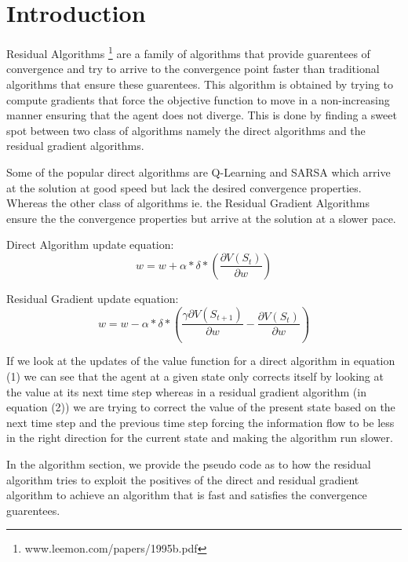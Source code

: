 \documentclass[fleqn]{article}
\begin{document}

\section*{Introduction}
Residual Algorithms \footnote{www.leemon.com/papers/1995b.pdf} are a family of algorithms that provide guarentees of convergence and try to arrive to the convergence point faster than traditional algorithms that ensure these guarentees. This algorithm is obtained by trying to compute gradients that force the objective function to move in a non-increasing manner ensuring that the agent does not diverge. This is done by finding a sweet spot between two class of algorithms namely the direct algorithms and the residual gradient algorithms.

Some of the popular direct algorithms are Q-Learning and SARSA which arrive at the solution at good speed but lack the desired convergence properties. Whereas the other class of algorithms ie. the Residual Gradient Algorithms ensure the the convergence properties but arrive at the solution at a slower pace.

Direct Algorithm update equation:
\begin{equation}
w = w + \alpha * \delta * (\frac{\partial V(S_t)}{\partial w} )
\end{equation}

Residual Gradient update equation:
\begin{equation}
w = w - \alpha * \delta * (\frac{\gamma \partial V(S_{t+1})}{\partial w} - \frac{\partial V(S_t)}{\partial w} )
\end{equation}


If we look at the updates of the value function for a direct algorithm in equation (1) we can see that the agent at a given state only corrects itself by looking at the value at its next time step whereas in a residual gradient algorithm (in equation (2)) we are trying to correct the value of the present state based on the next time step and the previous time step forcing the information flow to be less in the right direction for the current state and making the algorithm run slower.

In the algorithm section, we provide the pseudo code as to how the residual algorithm tries to exploit the positives of the direct and residual gradient algorithm to achieve an algorithm that is fast and satisfies the convergence guarentees. 
\end{document}
